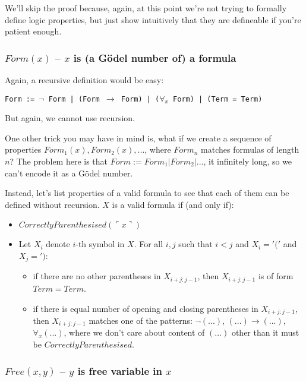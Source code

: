 \documentclass{article}
\begin{document}
We'll skip the proof because, again, at this point we're not trying to formally define
logic properties, but just show intuitively that they are defineable if you're patient enough.

\subsubsection{$Form(x)$ -- $x$ is (a Gödel number of) a formula}

Again, a recursive definition would be easy:

\begin{center}
    \texttt{Form := $\neg$ Form | (Form $\rightarrow$ Form) | ($\forall_x$ Form) | (Term = Term)}
\end{center}

But again, we cannot use recursion.

One other trick you may have in mind is, what if we create a sequence of properties
$Form_1(x), Form_2(x), ...$, where $Form_n$ matches formulas of length $n$? The problem here is that
$Form := Form_1 | Form_2 | ...$, it infinitely long, so we can't encode it as a Gödel number.

Instead, let's list properties of a valid formula to see that each of them can be defined without
recursion.
$X$ is a valid formula if (and only if):
\begin{itemize}
    \item $CorrectlyParenthesised(\ulcorner x \urcorner)$
    \item Let $X_i$ denote $i$-th symbol in $X$. For all $i, j$ such that $i < j$ and $X_i = '('$
        and $X_j = ')$:
        \begin{itemize}
            \item if there are no other parentheses in $X_{i + j : j - 1}$, then $X_{i + j : j - 1}$
                is of form $Term = Term$.
            \item if there is equal number of opening and closing parentheses in $X_{i + j : j - 1}$,
                then $X_{i + j : j - 1}$ matches one of the patterns: $\neg (...)$, $(...) \rightarrow (...)$,
                $\forall_x (...)$, where we don't care about content of $(...)$ other than it must be
                $CorrectlyParenthesised$.
        \end{itemize}
\end{itemize}

\subsubsection{$Free(x, y)$ -- $y$ is free variable in $x$}
\end{document}
